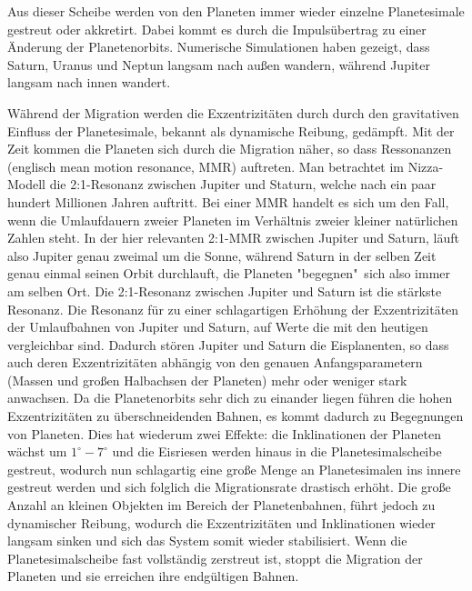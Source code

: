 \documentclass[10pt,a4paper,twoside]{article}
\begin{document}
Aus dieser Scheibe werden von den Planeten immer wieder einzelne Planetesimale gestreut oder akkretirt. Dabei kommt es durch die Impulsübertrag zu einer Änderung der Planetenorbits.\cite{Tsiganis2005} %
Numerische Simulationen haben gezeigt, dass Saturn, Uranus und Neptun langsam nach außen wandern, während Jupiter langsam nach innen wandert.\cite{Tsiganis2005}\cite{Hahn1999} %

Während der Migration werden die Exzentrizitäten durch durch den gravitativen Einfluss der Planetesimale, bekannt als dynamische Reibung, gedämpft.\cite{Tsiganis2005}
Mit der Zeit kommen die Planeten sich durch die Migration näher, so dass Ressonanzen (englisch mean motion resonance, MMR) auftreten.
Man betrachtet im Nizza-Modell die 2:1-Resonanz zwischen Jupiter und Staturn, welche nach ein paar hundert Millionen Jahren auftritt.
Bei einer MMR handelt es sich um den Fall, wenn die Umlaufdauern zweier Planeten im Verhältnis zweier kleiner natürlichen Zahlen steht. In der hier relevanten 2:1-MMR zwischen Jupiter und Saturn, läuft also Jupiter genau zweimal um die Sonne, während Saturn in der selben Zeit genau einmal seinen Orbit durchlauft, die Planeten "begegnen"\ sich also immer am selben Ort. %
Die 2:1-Resonanz zwischen Jupiter und Saturn ist die stärkste Resonanz. %
Die Resonanz für zu einer schlagartigen Erhöhung der Exzentrizitäten der Umlaufbahnen von Jupiter und Saturn, auf Werte die mit den heutigen vergleichbar sind. %
Dadurch stören Jupiter und Saturn die Eisplanenten, so dass auch deren Exzentrizitäten abhängig von den genauen Anfangsparametern (Massen und großen Halbachsen der Planeten) mehr oder weniger stark anwachsen\cite{Tsiganis2005}.
Da die Planetenorbits sehr dich zu einander liegen führen die hohen Exzentrizitäten zu überschneidenden Bahnen\cite{Tsiganis2005}, es kommt dadurch zu Begegnungen von Planeten. %
Dies hat wiederum zwei Effekte: die Inklinationen der Planeten wächst um $1^\circ-7^\circ$ und die Eisriesen werden hinaus in die Planetesimalscheibe gestreut,
wodurch nun schlagartig eine große Menge an Planetesimalen ins innere gestreut werden und sich folglich die Migrationsrate drastisch erhöht\cite{Tsiganis2005}.
Die große Anzahl an kleinen Objekten im Bereich der Planetenbahnen, führt jedoch zu dynamischer Reibung, wodurch die Exzentrizitäten und Inklinationen wieder langsam sinken und sich das System somit wieder stabilisiert\cite{Tsiganis2005}.
Wenn die Planetesimalscheibe fast vollständig zerstreut ist, stoppt die Migration der Planeten und sie erreichen ihre endgültigen Bahnen\cite{Tsiganis2005}.
\end{document}
